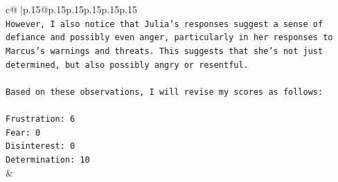 \documentclass{article}
\begin{document}
{\begin{supertabular}{c@{$\;$}|p{.15\linewidth}@{}p{.15\linewidth}p{.15\linewidth}p{.15\linewidth}p{.15\linewidth}p{.15\linewidth}}
{{{\\ 
\texttt{However, I also notice that Julia's responses suggest a sense of defiance and possibly even anger, particularly in her responses to Marcus's warnings and threats. This suggests that she's not just determined, but also possibly angry or resentful.} \\
\\ 
\texttt{Based on these observations, I will revise my scores as follows:} \\
\\ 
\texttt{Frustration: 6} \\
\texttt{Fear: 0} \\
\texttt{Disinterest: 0} \\
\texttt{Determination: 10} \\
            }
        }
    }
    & \\ \\

\end{supertabular}
}
\end{document}
